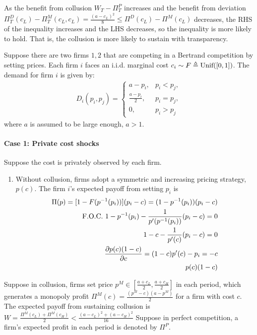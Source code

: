 \documentclass[12pt]{article}
\begin{document}
As the benefit from collusion $W_T-\Pi^P_T$ increases and the benefit from deviation $\Pi^D_T(c_L)-\Pi^M_T(c_L,c_L)=\frac{(a-c_L)^2}{8}\leq\Pi^D(c_L)-\Pi^M(c_L)$ decreases, the RHS of the inequality increases and the LHS decreases, so the inequality is more likely to hold. That is, the collusion is more likely to sustain with transparency.





Suppose there are two firms $1,2$ that are competing in a Bertrand competition by setting prices. Each firm $i$ faces an i.i.d. marginal cost $c_i\sim F\triangleq\textnormal{Unif}([0,1])$. The demand for firm $i$ is given by:
\begin{equation}
    \begin{aligned}
        D_i(p_i,p_j)=\left\{\begin{matrix}
            a-p_i,& p_i<p_j,\\
            \frac{a-p_i}{2},& p_i=p_j,\\
            0,& p_i>p_j
        \end{matrix}\right.
    \end{aligned}
    \nonumber
\end{equation}
where $a$ is assumed to be large enough, $a>1$.

\paragraph{Case 1: Private cost shocks}
Suppose the cost is privately observed by each firm.
\begin{enumerate}
    \item Without collusion, firms adopt a symmetric and increasing pricing strategy, $p(c)$. The firm $i$'s expected payoff from setting $p_i$ is
    \begin{equation}
        \begin{aligned}
            \Pi(p)=[1-F(p^{-1}(p_i))](p_i-c)=(1-p^{-1}(p_i))(p_i-c)\\
            \textnormal{F.O.C. }1-p^{-1}(p_i)-\frac{1}{p'(p^{-1}(p_i))}(p_i-c)=0\\
            1-c-\frac{1}{p'(c)}(p_i-c)=0\\
            \frac{\partial p(c)(1-c)}{\partial c}=(1-c)p'(c)-p_i=-c\\
            p(c)(1-c)
        \end{aligned}
        \nonumber
    \end{equation}
\end{enumerate}
Suppose in collusion, firms set price $p^M\in\left[\frac{a+c_L}{2},\frac{a+c_H}{2}\right]$ in each period, which generates a monopoly profit $\Pi^M(c)=\frac{(p^M-c)(a-p^M)}{2}$ for a firm with cost $c$. The expected payoff from sustaining collusion is $W=\frac{\Pi^M(c_L)+\Pi^M(c_H)}{2}<\frac{(a-c_L)^2+(a-c_H)^2}{16}$  Suppose in perfect competition, a firm's expected profit in each period is denoted by $\Pi^P$.
\end{document}
